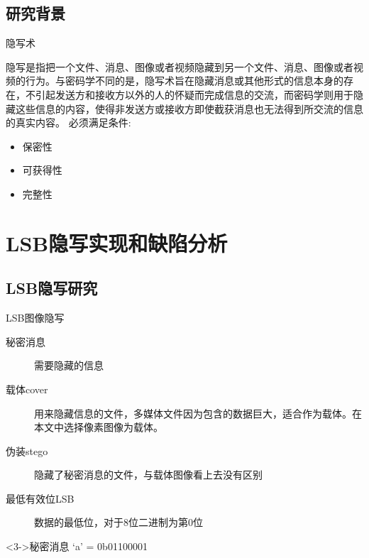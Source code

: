 \documentclass[14pt]{Bredelebeamer}
\begin{document}
\subsection{研究背景}
\begin{frame}{隐写术}

{\large
隐写是指把一个文件、消息、图像或者视频隐藏到另一个文件、消息、图像或者视频的行为。与密码学不同的是，隐写术旨在隐藏消息或其他形式的信息本身的\alert{存在}，不引起发送方和接收方以外的人的怀疑而完成信息的交流，而密码学则用于隐藏这些信息的\alert{内容}，使得非发送方或接收方即使截获消息也无法得到所交流的信息的真实内容。
必须满足条件:
\begin{itemize}
  \item	保密性
  \item 可获得性
  \item 完整性
\end{itemize}
}
\end{frame}

\section{LSB隐写实现和缺陷分析}
\subsection{LSB隐写研究}
\begin{frame}{LSB图像隐写}
\begin{description}
  \item[秘密消息] 需要隐藏的信息
  \item[载体cover] 用来隐藏信息的文件，多媒体文件因为包含的数据巨大，适合作为载体。在本文中选择像素图像为载体。
  \item[伪装stego] 隐藏了秘密消息的文件，与载体图像看上去没有区别
  \item[最低有效位LSB] 数据的最低位，对于8位二进制为第0位 
\end{description}
\begin{alertblock}<3->{秘密消息}
  `a' = 0b\textcolor<4>{alertTitleBlockColor}{01100001}
\end{alertblock}

\pause



\end{frame}
\end{document}
